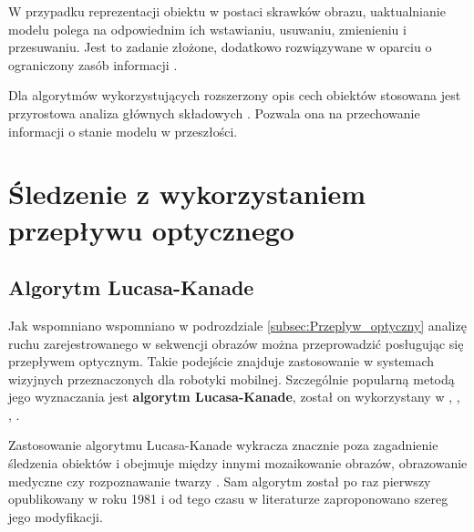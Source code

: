 W przypadku reprezentacji obiektu w postaci skrawków obrazu, uaktualnianie modelu polega na odpowiednim ich wstawianiu, usuwaniu, zmienieniu i przesuwaniu. Jest to zadanie złożone, dodatkowo rozwiązywane w oparciu o ograniczony zasób informacji \cite{Smeulders2010}.

Dla algorytmów wykorzystujących rozszerzony opis cech obiektów stosowana jest przyrostowa analiza głównych składowych \cite{Smeulders2010}. Pozwala ona na przechowanie informacji o stanie modelu w przeszłości. 

\section{Śledzenie z wykorzystaniem przepływu optycznego}
\label{sec:Sledzenie_z_wykorzystaniem_przeplywu_optycznego}


\subsection{Algorytm Lucasa-Kanade}
\label{subsec:Algorytm_Lucasa_Kanade}
Jak wspomniano wspomniano w podrozdziale \ref{subsec:Przeplyw_optyczny} analizę ruchu zarejestrowanego w sekwencji obrazów można przeprowadzić posługując się przepływem optycznym. Takie podejście znajduje zastosowanie w systemach wizyjnych przeznaczonych dla robotyki mobilnej. Szczególnie popularną metodą jego wyznaczania jest \textbf{algorytm Lucasa-Kanade}, został on wykorzystany w \cite{Markovic2014}, \cite{Sadeghi-Tehran2014}, \cite{Fernandez-Caballero2010}, \cite{Liem2008}.

Zastosowanie algorytmu Lucasa-Kanade wykracza znacznie poza zagadnienie śledzenia obiektów i obejmuje między innymi mozaikowanie obrazów, obrazowanie medyczne czy rozpoznawanie twarzy \cite{Baker2004}. Sam algorytm został po raz pierwszy opublikowany w roku 1981 i od tego czasu w literaturze zaproponowano szereg jego modyfikacji.

